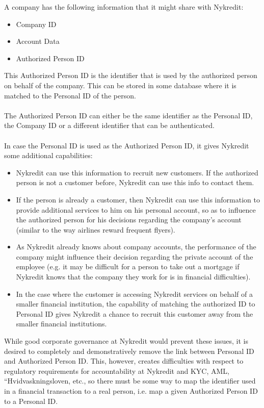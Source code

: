 A company has the following information that it might share with Nykredit:
\begin{itemize}
	\item Company ID	
	\item Account Data
	\item Authorized Person ID
\end{itemize}
This Authorized Person ID is the identifier that is used by the authorized person on behalf of the company. This can be stored in some database where it is matched to the Personal ID of the person.
\\
\\The Authorized Person ID can either be the same identifier as the Personal ID, the Company ID or a different identifier that can be authenticated. 
\\
\\In case the Personal ID is used as the Authorized Person ID, it gives Nykredit some additional capabilities:
\begin{itemize}
\item Nykredit can use this information to recruit new customers. If the authorized person is not a customer before, Nykredit can use this info to contact them.
\item If the person is already a customer, then Nykredit can use this information to provide additional services to him on his personal account, so as to influence the authorized person for his decisions regarding the company's account (similar to the way airlines reward frequent flyers).
\item As Nykredit already knows about company accounts, the performance of the company might influence their decision regarding the private account of the employee (e.g. it may be difficult for a person to take out a mortgage if Nykredit knows that the company they work for is in financial difficulties).
\item In the case where the customer is accessing Nykredit services on behalf of a smaller financial institution, the capability of matching the authorized ID to Personal ID gives Nykredit a chance to recruit this customer away from the smaller financial institutions.
\end{itemize}
While good corporate governance at Nykredit would prevent these issues, it is desired to completely and demonstratively remove the link between Personal ID and Authorized Person ID. This, however, creates difficulties with respect to regulatory requirements for accountability at Nykredit and KYC, AML, “Hvidvaskningsloven, etc., so there must be some way to map the identifier used in a financial transaction to a real person, i.e. map a given Authorized Person ID to a Personal ID.


